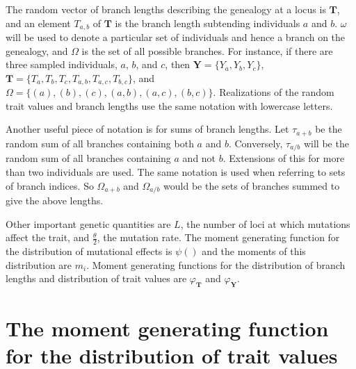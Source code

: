 \documentclass{article}
\newcommand{\T}{\frac{\theta}{2}}
\begin{document}
The random vector of branch lengths describing the genealogy at a locus is
$\mathbf{T}$, and an element $T_{a,b}$ of $\mathbf{T}$ is the branch length
subtending individuals $a$ and $b$. $\omega$ will be used to denote a particular
set of individuals and hence a branch on the genealogy, and $\Omega$ is the set
of all possible branches. For instance, if there are three sampled individuals,
$a$, $b$, and $c$, then $\mathbf{Y}=\{Y_a,Y_b,Y_c\}$,
$\mathbf{T}=\{T_a,T_b,T_c,T_{a,b},T_{a,c},T_{b,c}\}$, and
$\Omega=\{(a),(b),(c),(a,b),(a,c),(b,c)\}$. Realizations of the random trait
values and branch lengths use the same notation with lowercase letters.

Another useful piece of notation is for sums of branch lengths. Let $\tau_{a+b}$
be the random sum of all branches containing both $a$ and $b$. Conversely,
$\tau_{a/b}$ will be the random sum of all branches containing $a$ and not $b$.
Extensions of this for more than two individuals are used. The same notation is
used when referring to sets of branch indices. So $\Omega_{a+b}$ and
$\Omega_{a/b}$ would be the sets of branches summed to give the above lengths.

Other important genetic quantities are $L$, the number of loci at which
mutations affect the trait, and $\T$, the mutation rate. The moment generating
function for the distribution of mutational effects is $\psi()$ and the moments
of this distribution are $m_i$. Moment generating functions for the distribution
of branch lengths and distribution of trait values are $\varphi_{\mathbf{T}}$
and $\varphi_{\mathbf{Y}}$.

\section{The moment generating function for the distribution of trait values}




\end{document}
